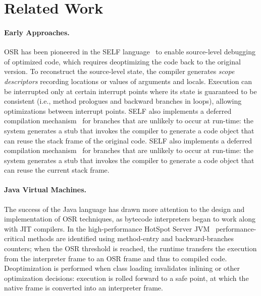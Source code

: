 \section{Related Work}
\label{se:related}

\paragraph{Early Approaches.}

OSR has been pioneered in the SELF language~\cite{holzle1992self} to enable source-level debugging of optimized code, which requires deoptimizing the code back to the original version. To reconstruct the source-level state, the compiler generates {\em scope descriptors} recording locations or values of arguments and locals. Execution can be interrupted only at certain interrupt points where its state is guaranteed to be consistent (i.e., method prologues and backward branches in loops), allowing optimizations between interrupt points.
\ifdefined \fullver
SELF also implements a deferred compilation mechanism~\cite{chambers1991self} for branches that are unlikely to occur at run-time: the system generates a stub that invokes the compiler to generate a code object that can reuse the stack frame of the original code.
\else
SELF also implements a deferred compilation mechanism~\cite{chambers1991self} for branches that are unlikely to occur at run-time: the system generates a stub that invokes the compiler to generate a code object that can reuse the current stack frame.
\fi

\paragraph{Java Virtual Machines.}
The success of the Java language has drawn more attention to the design and implementation of OSR techniques, as bytecode interpreters began to work along with JIT compilers. In the high-performance HotSpot Server JVM~\cite{paleczny2001hotspot} performance-critical methods are identified using method-entry and backward-branches counters; when the OSR threshold is reached, the runtime transfers the execution from the interpreter frame to an OSR frame and thus to compiled code. Deoptimization is performed when class loading invalidates inlining or other optimization decisions: execution is rolled forward to a safe point, at which the native frame is converted into an interpreter frame.

